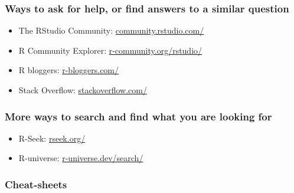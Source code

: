 \documentclass[
]{book}
\begin{document}
\hypertarget{ways-to-ask-for-help-or-find-answers-to-a-similar-question}{%
\subsubsection*{Ways to ask for help, or find answers to a similar question}\label{ways-to-ask-for-help-or-find-answers-to-a-similar-question}}

\begin{itemize}
\item
  The RStudio Community: \href{https://community.rstudio.com/}{community.rstudio.com/}
\item
  R Community Explorer: \href{https://r-community.org/rstudio/}{r-community.org/rstudio/}
\item
  R bloggers: \href{https://www.r-bloggers.com/}{r-bloggers.com/}
\item
  Stack Overflow: \href{https://stackoverflow.com/questions/tagged/r}{stackoverflow.com/}
\end{itemize}

\hypertarget{more-ways-to-search-and-find-what-you-are-looking-for}{%
\subsubsection*{More ways to search and find what you are looking for}\label{more-ways-to-search-and-find-what-you-are-looking-for}}

\begin{itemize}
\item
  R-Seek: \href{https://rseek.org/}{rseek.org/}
\item
  R-universe: \href{https://r-universe.dev/search/}{r-universe.dev/search/}
\end{itemize}

\hypertarget{cheat-sheets}{%
\subsubsection*{Cheat-sheets}\label{cheat-sheets}}
\end{document}
